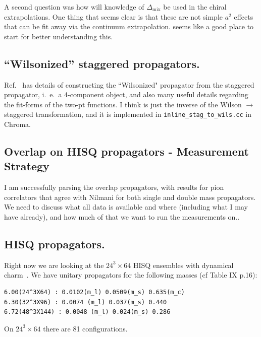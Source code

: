 \documentclass[11pt,a4paper]{article}
\newcommand{\Dmix}[0]{\Delta_{\text{mix}}}
\begin{document}
A second question was how will knowledge of $\Dmix$ be used in the chiral extrapolations.
One thing that seems clear is that these are not simple $a^2$ effects that can be fit away via the continuum extrapolation.  
\cite{WalkerLoud:2008bp} seems like a good place to start for better understanding this.

\subsection{``Wilsonized'' staggered propagators.}
Ref.~\cite{Orginos:2007tw} has details of constructing the ``Wilsonized" propagator
from the staggered propagator, i.\ e.\ a 4-component object,
and also many useful details regarding the fit-forms of the two-pt functions.  I think is just the inverse
of the Wilson $\rightarrow$ staggered transformation, and it is implemented in {\tt inline\_stag\_to\_wils.cc} in Chroma.


\subsection{Overlap on HISQ propagators - Measurement Strategy}
I am successfully parsing the overlap propagators, with results for pion correlators that agree
with Nilmani for both single and double mass propagators.  We need to discuss what all data is available and where (including what I may have already), and how much of that we want to run the measurements on..


\subsection{HISQ propagators.}
Right now we are looking at the $24^3 \times 64$ HISQ ensembles with dynamical charm~\cite{Bazavov:2012xda}.
We have unitary propagators for the following masses (cf  Table IX p.16):
\begin{verbatim}
6.00(24^3X64) : 0.0102(m_l) 0.0509(m_s) 0.635(m_c)
6.30(32^3X96) : 0.0074 (m_l) 0.037(m_s) 0.440
6.72(48^3X144) : 0.0048 (m_l) 0.024(m_s) 0.286
\end{verbatim}
On $24^3 \times 64$ there are 81 configurations.
\end{document}
